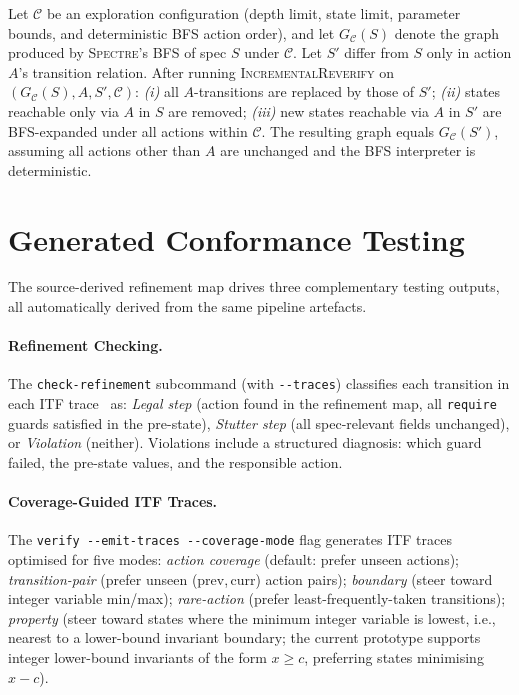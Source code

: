 \documentclass[runningheads]{llncs}
\begin{document}
\begin{proposition}\label{prop:incremental}
Let $\mathcal{C}$ be an exploration configuration (depth limit, state limit, parameter
bounds, and deterministic BFS action order), and let $G_{\mathcal{C}}(S)$ denote
the graph produced by \textsc{Spectre}'s BFS of spec $S$ under $\mathcal{C}$.
Let $S'$ differ from $S$ only in action $A$'s transition relation.
After running \textsc{IncrementalReverify} on $(G_{\mathcal{C}}(S), A, S', \mathcal{C})$:
\emph{(i)} all $A$-transitions are replaced by those of $S'$;
\emph{(ii)} states reachable only via $A$ in $S$ are removed;
\emph{(iii)} new states reachable via $A$ in $S'$ are BFS-expanded under all
actions within $\mathcal{C}$.
The resulting graph equals $G_{\mathcal{C}}(S')$, assuming all actions
other than $A$ are unchanged and the BFS interpreter is deterministic.
\end{proposition}

\section{Generated Conformance Testing}\label{sec:conformance}

The source-derived refinement map drives three complementary testing outputs,
all automatically derived from the same pipeline artefacts.

\paragraph{Refinement Checking.}
The \texttt{check-refinement} subcommand (with \texttt{-{}-traces})
classifies each transition in each ITF trace~\cite{apalache-itf} as: \emph{Legal step} (action
found in the refinement map, all \texttt{require} guards satisfied in the
pre-state), \emph{Stutter step} (all spec-relevant fields unchanged), or
\emph{Violation} (neither).  Violations include a structured diagnosis: which
guard failed, the pre-state values, and the responsible action.

\paragraph{Coverage-Guided ITF Traces.}
The \texttt{verify -{}-emit-traces -{}-coverage-mode} flag generates ITF
traces optimised for five modes:
\emph{action coverage} (default: prefer unseen actions);
\emph{transition-pair} (prefer unseen (prev,\,curr) action pairs);
\emph{boundary} (steer toward integer variable min/max);
\emph{rare-action} (prefer least-frequently-taken transitions);
\emph{property} (steer toward states where the minimum integer variable is lowest,
i.e., nearest to a lower-bound invariant boundary; the current prototype
supports integer lower-bound invariants of the form $x \ge c$, preferring
states minimising $x - c$).
\end{document}
